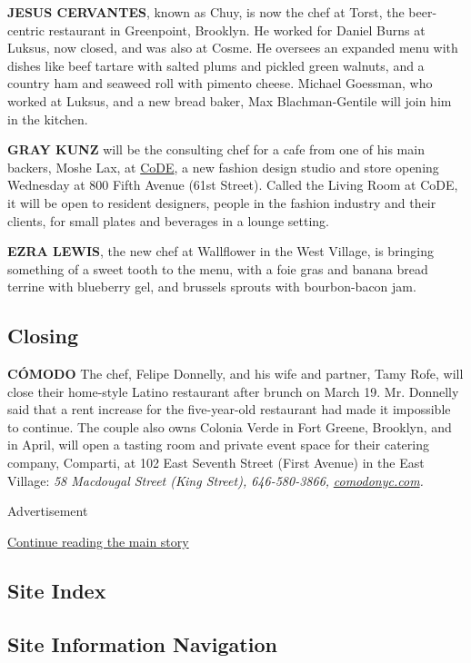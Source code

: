 \textbf{JESUS CERVANTES}, known as Chuy, is now the chef at Torst, the
beer-centric restaurant in Greenpoint, Brooklyn. He worked for Daniel
Burns at Luksus, now closed, and was also at Cosme. He oversees an
expanded menu with dishes like beef tartare with salted plums and
pickled green walnuts, and a country ham and seaweed roll with pimento
cheese. Michael Goessman, who worked at Luksus, and a new bread baker,
Max Blachman-Gentile will join him in the kitchen.

\textbf{GRAY KUNZ} will be the consulting chef for a cafe from one of
his main backers, Moshe Lax, at \href{https://code800fifth.com/}{CoDE},
a new fashion design studio and store opening Wednesday at 800 Fifth
Avenue (61st Street). Called the Living Room at CoDE, it will be open to
resident designers, people in the fashion industry and their clients,
for small plates and beverages in a lounge setting.

\textbf{EZRA LEWIS}, the new chef at Wallflower in the West Village, is
bringing something of a sweet tooth to the menu, with a foie gras and
banana bread terrine with blueberry gel, and brussels sprouts with
bourbon-bacon jam.

\hypertarget{closing}{%
\subsection{Closing}\label{closing}}

\textbf{CÓMODO} The chef, Felipe Donnelly, and his wife and partner,
Tamy Rofe, will close their home-style Latino restaurant after brunch on
March 19. Mr. Donnelly said that a rent increase for the five-year-old
restaurant had made it impossible to continue. The couple also owns
Colonia Verde in Fort Greene, Brooklyn, and in April, will open a
tasting room and private event space for their catering company,
Comparti, at 102 East Seventh Street (First Avenue) in the East Village:
\emph{58 Macdougal Street (King Street), 646-580-3866,}
\href{http://comodonyc.com/}{\emph{comodonyc.com}}\emph{.}

Advertisement

\protect\hyperlink{after-bottom}{Continue reading the main story}

\hypertarget{site-index}{%
\subsection{Site Index}\label{site-index}}

\hypertarget{site-information-navigation}{%
\subsection{Site Information
Navigation}\label{site-information-navigation}}

